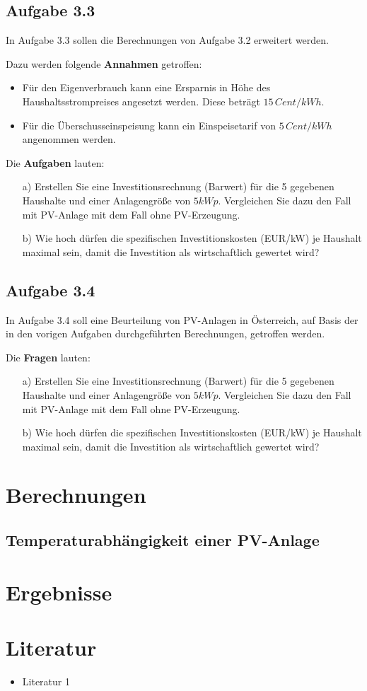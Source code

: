 \documentclass[a4paper,12pt]{article}
\begin{document}
	\subsection{Aufgabe 3.3}
	In Aufgabe 3.3 sollen die Berechnungen von Aufgabe 3.2 erweitert werden.\\ \par
	\noindent Dazu werden folgende \textbf{Annahmen} getroffen:
	\begin{itemize}
		\item Für den Eigenverbrauch kann eine Ersparnis in Höhe des Haushaltsstrompreises angesetzt werden. Diese beträgt $15\,Cent/kWh$.
		\item Für die Überschusseinspeisung kann ein Einspeisetarif von $5\,Cent/kWh$ angenommen werden.
	\end{itemize}
	Die \textbf{Aufgaben} lauten:
	\begin{itemize}
		\item[a)] Erstellen Sie eine Investitionsrechnung (Barwert) für die 5 gegebenen Haushalte und einer Anlagengröße von $5kWp$. Vergleichen Sie dazu den Fall mit PV-Anlage mit dem Fall ohne PV-Erzeugung.
		\item[b)] Wie hoch dürfen die spezifischen Investitionskosten (EUR/kW) je Haushalt maximal sein, damit die Investition als wirtschaftlich gewertet wird?
	\end{itemize}
	\subsection{Aufgabe 3.4}
	In Aufgabe 3.4 soll eine Beurteilung von PV-Anlagen in Österreich, auf Basis der in den vorigen Aufgaben durchgeführten Berechnungen, getroffen werden.\\ \par
	\noindent Die \textbf{Fragen} lauten:
	\begin{itemize}
		\item[a)] Erstellen Sie eine Investitionsrechnung (Barwert) für die 5 gegebenen Haushalte und einer Anlagengröße von $5kWp$. Vergleichen Sie dazu den Fall mit PV-Anlage mit dem Fall ohne PV-Erzeugung.
		\item[b)] Wie hoch dürfen die spezifischen Investitionskosten (EUR/kW) je Haushalt maximal sein, damit die Investition als wirtschaftlich gewertet wird?
	\end{itemize}
	\newpage
	\section{Berechnungen}
	\subsection{Temperaturabhängigkeit einer PV-Anlage}

	\section{Ergebnisse}

	\newpage
	\section{Literatur}
	\begin{itemize}
		\item Literatur 1
	\end{itemize}
	\listoffigures
\end{document}
